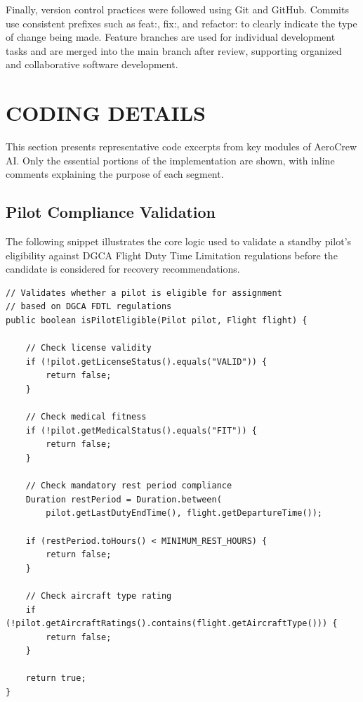 \documentclass[12pt,a4paper]{report}
\begin{document}
Finally, version control practices were followed using Git and GitHub. Commits use consistent prefixes such as feat:, fix:, and refactor: to clearly indicate the type of change being made. Feature branches are used for individual development tasks and are merged into the main branch after review, supporting organized and collaborative software development.

\section{CODING DETAILS}

This section presents representative code excerpts from key modules of AeroCrew AI. Only the essential portions of the implementation are shown, with inline comments explaining the purpose of each segment.

\subsection{Pilot Compliance Validation}

The following snippet illustrates the core logic used to validate a standby pilot's eligibility against DGCA Flight Duty Time Limitation regulations before the candidate is considered for recovery recommendations.

\begin{singlespace}
\begin{verbatim}
// Validates whether a pilot is eligible for assignment
// based on DGCA FDTL regulations
public boolean isPilotEligible(Pilot pilot, Flight flight) {

    // Check license validity
    if (!pilot.getLicenseStatus().equals("VALID")) {
        return false;
    }

    // Check medical fitness
    if (!pilot.getMedicalStatus().equals("FIT")) {
        return false;
    }

    // Check mandatory rest period compliance
    Duration restPeriod = Duration.between(
        pilot.getLastDutyEndTime(), flight.getDepartureTime());

    if (restPeriod.toHours() < MINIMUM_REST_HOURS) {
        return false;
    }

    // Check aircraft type rating
    if (!pilot.getAircraftRatings().contains(flight.getAircraftType())) {
        return false;
    }

    return true;
}
\end{verbatim}
\end{singlespace}
\end{document}
